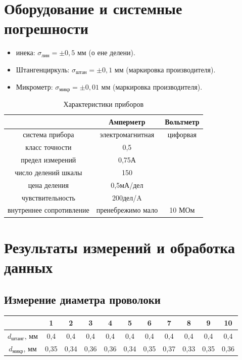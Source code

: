 \documentclass[a4paper]{article}
\begin{document}
\section{Оборудование и системные погрешности}

\begin{itemize}
  \item инека: $\sigma_\text{лин} = \pm0,5$ мм (о ене делени).
  \item Штангенциркуль: $\sigma_\text{штан} = \pm0,1$ мм (маркировка производителя).
  \item Микрометр:  $\sigma_\text{микр} = \pm0,01$ мм (маркировка производителя).
\end{itemize}  

\begin{table}[htbp]
\centering
\caption{Характеристики приборов}
\begin{tabular}{|c|c|c|}
\hline
 & Амперметр & Вольтметр \\
\hline
система прибора & электромагнитная & цифорвая \\
\hline
класс точности & 0,5 & \\
\hline
предел измерений & 0,75А & \\
\hline
число делений шкалы & 150 & \\
\hline
цена деления & 0,5мА/дел & \\
\hline
чувствительность & 200дел/A & \\
\hline
внутреннее сопротивление & пренебрежимо мало & 10 МОм\\
\hline
\end{tabular}
\end{table}

\section{Результаты измерений и обработка данных}
\subsection{Измерение диаметра проволоки}
\begin{center}
    \begin{tabular}{|c | c | c | c | c | c | c | c | c | c | c |} 
     \hline
      & 1 & 2 & 3& 4& 5& 6 & 7 & 8 & 9 & 10 \\
    \hline
     $d_\text{штанг}$, мм & 0,4 & 0,4 & 0,4 & 0,4 & 0,4 & 0,4 & 0,4 & 0,4 & 0,4 & 0,4  \\ 
     \hline
     $d_\text{микр}$, мм & 0,35 & 0,34 & 0,36 & 0,36 & 0,34 & 0,35 & 0,37 & 0,33 & 0,35 & 0,36 \\
     \hline
    \end{tabular} 
\end{center}
\end{document}
